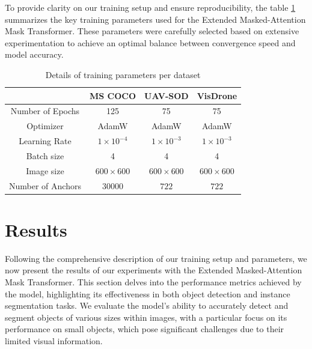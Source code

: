 To provide clarity on our training setup and ensure reproducibility, the table \ref{tab:training_parameters} summarizes the key training parameters used for the 
Extended Masked-Attention Mask Transformer. These parameters were carefully selected based on extensive experimentation to achieve an optimal balance between 
convergence speed and model accuracy. 
\begin{table}[h]
\centering
\begin{tabular}{|c|c|c|c|}
    \hline
    &                   \textbf{MS COCO}      & \textbf{UAV-SOD}     & \textbf{VisDrone}            \\ \hline
    Number of Epochs   & 125                  & 75                   & 75                           \\ \hline
    Optimizer          & AdamW                & AdamW                & AdamW                        \\ \hline
    Learning Rate      & $1 \times 10^{-4}$   & $1 \times 10^{-3}$   & $1 \times 10^{-3}$           \\ \hline
    Batch size         & 4                    &  4                   & 4                            \\ \hline
    Image size         & $600\times600$       &  $600\times600$      & $600\times600$               \\ \hline
    Number of Anchors  & $30000$              &  $722$               & $722$                        \\ \hline
\end{tabular}
\caption{Details of training parameters per dataset}
\label{tab:training_parameters}
\end{table}

\newpage

\section{Results}

Following the comprehensive description of our training setup and parameters, we now present the results of our experiments with the Extended Masked-Attention 
Mask Transformer. This section delves into the performance metrics achieved by the model, highlighting its effectiveness in both object detection and instance 
segmentation tasks. We evaluate the model's ability to accurately detect and segment objects of various sizes within images, with a particular focus on its 
performance on small objects, which pose significant challenges due to their limited visual information.


